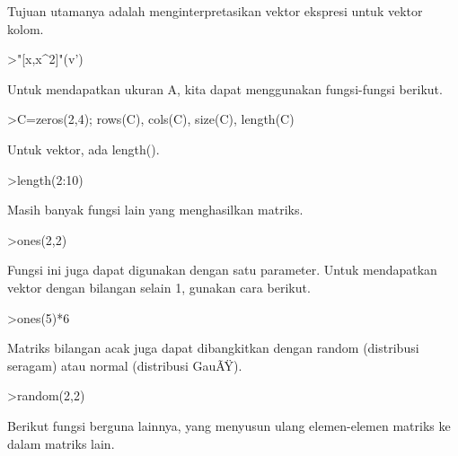 \documentclass[a4paper,10pt]{article}
\begin{document}
\begin{eulernotebook}
\begin{euleroutput}
  Tujuan utamanya adalah menginterpretasikan vektor ekspresi untuk vektor kolom.
  
\end{euleroutput}
\begin{eulerprompt}
>"[x,x^2]"(v')
\end{eulerprompt}
\begin{euleroutput}
  
  Untuk mendapatkan ukuran A, kita dapat menggunakan fungsi-fungsi berikut.
  
\end{euleroutput}
\begin{eulerprompt}
>C=zeros(2,4); rows(C), cols(C), size(C), length(C)
\end{eulerprompt}
\begin{euleroutput}
  
  Untuk vektor, ada length().
  
\end{euleroutput}
\begin{eulerprompt}
>length(2:10)
\end{eulerprompt}
\begin{euleroutput}
  
  Masih banyak fungsi lain yang menghasilkan matriks.
  
\end{euleroutput}
\begin{eulerprompt}
>ones(2,2)
\end{eulerprompt}
\begin{euleroutput}
  
  Fungsi ini juga dapat digunakan dengan satu parameter. Untuk mendapatkan vektor dengan bilangan selain 1, gunakan cara berikut.
  
\end{euleroutput}
\begin{eulerprompt}
>ones(5)*6
\end{eulerprompt}
\begin{euleroutput}
  
  Matriks bilangan acak juga dapat dibangkitkan dengan random (distribusi seragam) atau normal (distribusi GauÃŸ).
  
\end{euleroutput}
\begin{eulerprompt}
>random(2,2)
\end{eulerprompt}
\begin{euleroutput}
  
  Berikut fungsi berguna lainnya, yang menyusun ulang elemen-elemen matriks ke dalam matriks lain.
  

\end{euleroutput}
\end{eulernotebook}
\end{document}
